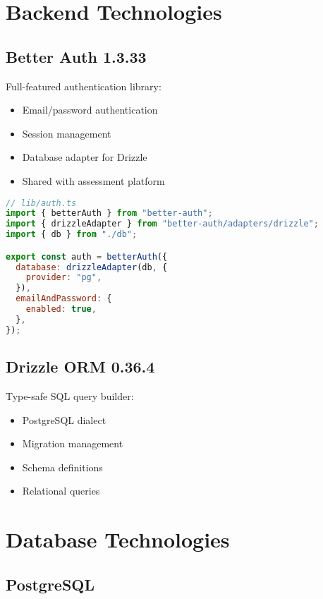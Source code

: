 \documentclass[12pt,a4paper]{report}
\begin{document}
\section{Backend Technologies}

\subsection{Better Auth 1.3.33}

Full-featured authentication library:
\begin{itemize}
    \item Email/password authentication
    \item Session management
    \item Database adapter for Drizzle
    \item Shared with assessment platform
\end{itemize}

\begin{lstlisting}[language=JavaScript, caption=Better Auth Configuration]
// lib/auth.ts
import { betterAuth } from "better-auth";
import { drizzleAdapter } from "better-auth/adapters/drizzle";
import { db } from "./db";

export const auth = betterAuth({
  database: drizzleAdapter(db, {
    provider: "pg",
  }),
  emailAndPassword: {
    enabled: true,
  },
});
\end{lstlisting}

\subsection{Drizzle ORM 0.36.4}

Type-safe SQL query builder:
\begin{itemize}
    \item PostgreSQL dialect
    \item Migration management
    \item Schema definitions
    \item Relational queries
\end{itemize}

\section{Database Technologies}

\subsection{PostgreSQL}
\end{document}
